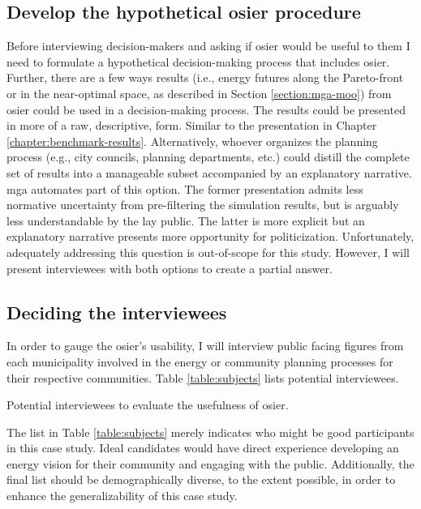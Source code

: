 \subsection{Develop the hypothetical \ac{osier} procedure}

Before interviewing decision-makers and asking if \ac{osier} would be useful to
them I need to formulate a hypothetical decision-making process that includes
\ac{osier}. Further, there are a few ways results (i.e., energy futures along
the Pareto-front or in the near-optimal space, as described in Section
\ref{section:mga-moo}) from \ac{osier} could be used in a decision-making
process. The results could be presented in more of a raw, descriptive, form.
Similar to the presentation in Chapter \ref{chapter:benchmark-results}.
Alternatively, whoever organizes the planning process (e.g., city councils,
planning departments, etc.) could distill the complete set of results into a
manageable subset accompanied by an explanatory narrative. \ac{mga} automates
part of this option. The former presentation admits less normative uncertainty
from pre-filtering the simulation results, but is arguably less understandable
by the lay public. The latter is more explicit but an explanatory narrative
presents more opportunity for politicization. Unfortunately, adequately
addressing this question is out-of-scope for this study. However, I will present
interviewees with both options to create a partial answer.

\subsection{Deciding the interviewees}

In order to gauge the \ac{osier}'s usability, I will interview public facing
figures from each municipality involved in the energy or community planning
processes for their respective communities. Table \ref{table:subjects} lists
potential interviewees.

\begin{table}[ht!]
    \centering
    \caption{Potential interviewees to evaluate the usefulness of \ac{osier}.}
    \resizebox*{\textwidth}{!}{}
    \label{table:subjects}
\end{table}

The list in Table \ref{table:subjects} merely indicates who might be good
participants in this case study. Ideal candidates would have direct experience
developing an energy vision for their community and engaging with the public.
Additionally, the final list should be demographically diverse, to the extent
possible, in order to enhance the generalizability of this case study.

